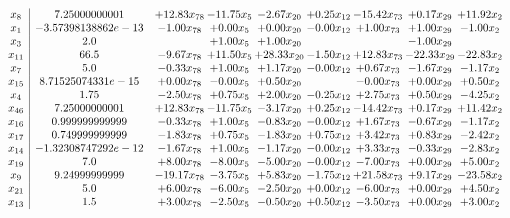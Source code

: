 \documentclass[8pt]{article}
\begin{document}
\[\begin{array}{c| c c@{\hskip 2pt} c@{\hskip 2pt} c@{\hskip 2pt} c@{\hskip 2pt} c@{\hskip 2pt} c@{\hskip 2pt} c@{\hskip 2pt} }
 x_{8}   &  7.25000000001 & + 12.83 x_{78} & -11.75 x_{5} & -2.67 x_{20} & +  0.25 x_{12} & -15.42 x_{73} & +  0.17 x_{29} & + 11.92 x_{2}\\
 x_{1}   &  -3.57398138862e-13 & -1.00 x_{78} & +  0.00 x_{5} & +  0.00 x_{20} & -0.00 x_{12} & +  1.00 x_{73} & +  1.00 x_{29} & -1.00 x_{2}\\
 x_{3}   &  2.0  &   & +  1.00 x_{5} & +  1.00 x_{20} &    &   & -1.00 x_{29} &   \\
 x_{11}   &  66.5 & -9.67 x_{78} & + 11.50 x_{5} & + 28.33 x_{20} & -1.50 x_{12} & + 12.83 x_{73} & -22.33 x_{29} & -22.83 x_{2}\\
 x_{7}   &  5.0 & -0.33 x_{78} & +  1.00 x_{5} & +  1.17 x_{20} & -0.00 x_{12} & +  0.67 x_{73} & -1.67 x_{29} & -1.17 x_{2}\\
 x_{15}   &  8.71525074331e-15 & +  0.00 x_{78} & -0.00 x_{5} & +  0.50 x_{20} &   & -0.00 x_{73} & +  0.00 x_{29} & +  0.50 x_{2}\\
 x_{4}   &  1.75 & -2.50 x_{78} & +  0.75 x_{5} & +  2.00 x_{20} & -0.25 x_{12} & +  2.75 x_{73} & +  0.50 x_{29} & -4.25 x_{2}\\
 x_{46}   &  7.25000000001 & + 12.83 x_{78} & -11.75 x_{5} & -3.17 x_{20} & +  0.25 x_{12} & -14.42 x_{73} & +  0.17 x_{29} & + 11.42 x_{2}\\
 x_{16}   &  0.999999999999 & -0.33 x_{78} & +  1.00 x_{5} & -0.83 x_{20} & -0.00 x_{12} & +  1.67 x_{73} & -0.67 x_{29} & -1.17 x_{2}\\
 x_{17}   &  0.749999999999 & -1.83 x_{78} & +  0.75 x_{5} & -1.83 x_{20} & +  0.75 x_{12} & +  3.42 x_{73} & +  0.83 x_{29} & -2.42 x_{2}\\
 x_{14}   &  -1.32308747292e-12 & -1.67 x_{78} & +  1.00 x_{5} & -1.17 x_{20} & -0.00 x_{12} & +  3.33 x_{73} & -0.33 x_{29} & -2.83 x_{2}\\
 x_{19}   &  7.0 & +  8.00 x_{78} & -8.00 x_{5} & -5.00 x_{20} & -0.00 x_{12} & -7.00 x_{73} & +  0.00 x_{29} & +  5.00 x_{2}\\
 x_{9}   &  9.24999999999 & -19.17 x_{78} & -3.75 x_{5} & +  5.83 x_{20} & -1.75 x_{12} & + 21.58 x_{73} & +  9.17 x_{29} & -23.58 x_{2}\\
 x_{21}   &  5.0 & +  6.00 x_{78} & -6.00 x_{5} & -2.50 x_{20} & +  0.00 x_{12} & -6.00 x_{73} & +  0.00 x_{29} & +  4.50 x_{2}\\
 x_{13}   &  1.5 & +  3.00 x_{78} & -2.50 x_{5} & -0.50 x_{20} & +  0.50 x_{12} & -3.50 x_{73} & +  0.00 x_{29} & +  3.00 x_{2}\\

\end{array}\]
\end{document}
